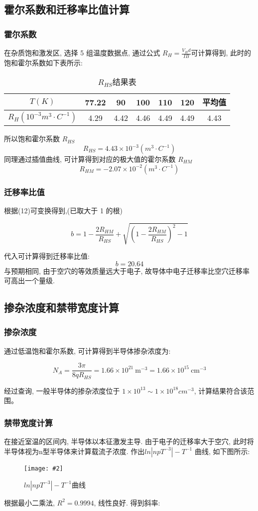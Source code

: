 \documentclass[12pt,a4paper]{article}
\newcommand{\be}[1]{
    \begin{equation}
        #1
    \end{equation}
}
\newcommand{\bfig}[3]{
    \begin{figure}[H]
        \centering
        \texttt{[image: \#2]}
        \caption{#3}
    \end{figure}
}
\begin{document}
\subsection{霍尔系数和迁移率比值计算}
\subsubsection{霍尔系数}
在杂质饱和激发区, 选择 5 组温度数据点, 通过公式 $R_H = \frac{V_H d}{IB}$可计算得到, 此时的饱和霍尔系数如下表所示:
\begin{table}[H]
    \centering
    \begin{tabular}{|c|c|c|c|c|c|c|}
    \hline
    $T(K)$ & 77.22 & 90 & 100 & 110 & 120 & 平均值 \\ \hline
    $R_H(10^{-3}m^3· C^{-1})$   & 4.29 & 4.42 & 4.46 & 4.49 & 4.49 & 4.43    \\ \hline
    \end{tabular}
    \caption{$R_{HS}$结果表}
    \end{table}
    所以饱和霍尔系数 $R_{HS}$
    $$R_{HS}=4.43\times 10^{-3}(m^3· C^{-1})$$
    同理通过插值曲线, 可计算得到对应的极大值的霍尔系数 $R_{HM}$
    $$R_{HM}=-2.07\times 10^{-2}(m^3· C^{-1})$$
\subsubsection{迁移率比值}
根据(12)可变换得到,(已取大于 1 的根)
\be{b=1-\frac{2 R_{H M}}{R_{H S}}+\sqrt{\left(1-\frac{2 R_{H M}}{R_{H S}}\right)^{2}-1}}
代入可计算得到迁移率比值:
$$b=20.64$$
与预期相同, 由于空穴的等效质量远大于电子, 故导体中电子迁移率比空穴迁移率可高出一个量级. 

\subsection{掺杂浓度和禁带宽度计算}
\subsubsection{掺杂浓度}
通过低温饱和霍尔系数, 可计算得到半导体掺杂浓度为:
\be{N_{A}=\frac{3 \pi}{8 q R_{H S}}=1.66 \times 10^{21} \mathrm{~m}^{-3}=1.66 \times 10^{15} \mathrm{~cm}^{-3}}
经过查询, 一般半导体的掺杂浓度位于 $1 \times 10^{13} \sim 1 \times 10^{18}cm^{-3}$, 计算结果符合该范围。
\subsubsection{禁带宽度计算}
在接近室温的区间内, 半导体以本征激发主导. 由于电子的迁移率大于空穴, 此时将半导体视为n型半导体来计算载流子浓度. 
作出$ln|npT^{-3}| - T^{-1}$ 曲线, 如下图所示:
\bfig{0.8}{linearfit.png}{$ln|npT^{-3}| - T^{-1}$曲线}
根据最小二乘法, $R^2=0.9994$, 线性良好. 得到斜率:
\end{document}
